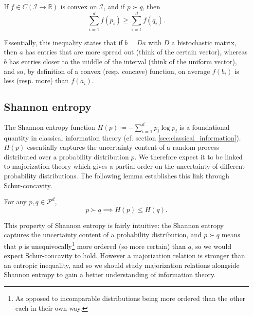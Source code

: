 \begin{lemma} \label{lem:karamata}
    If $f \in C(\mathcal{I} \to \mathbb{R})$ is convex on $\mathcal{I}$, and if $p \succ q$, then
    \begin{equation}
        \sum_{i=1}^{d} f(p_i) \geq \sum_{i=1}^{d} f(q_i).
    \end{equation}
\end{lemma}

Essentially, this inequality states that if $b = Da$ with $D$ a bistochastic matrix, then $a$ has entries that are more spread out (think of the certain vector), whereas $b$ has entries closer to the middle of the interval (think of the uniform vector), and so, by definition of a convex (resp. concave) function, on average $f(b_i)$ is less (resp. more) than $f(a_i)$.



\subsection{Shannon entropy} \label{sec:schur_shannon}

The Shannon entropy function $H(p) \coloneqq - \sum_{i = 1}^{d} p_i \log p_i$ is a foundational quantity in classical information theory (cf. section \ref{sec:classical_information}). $H(p)$ essentially captures the uncertainty content of a random process distributed over a probability distribution $p$. We therefore expect it to be linked to majorization theory which gives a partial order on the uncertainty of different probability distributions. The following lemma establishes this link through Schur-concavity.

\begin{lemma}
    For any $p, q \in \mathcal{P}^d$,
    \begin{equation}
        p \succ q \implies  H(p) \leq H(q).
    \end{equation}
\end{lemma}

This property of Shannon entropy is fairly intuitive: the Shannon entropy captures the uncertainty content of a probability distribution, and $p \succ q$ means that $p$ is unequivocally\footnote{As opposed to incomparable distributions being more ordered than the other each in their own way.} more ordered (so more certain) than $q$, so we would expect Schur-concavity to hold. However a majorization relation is stronger than an entropic inequality, and so we should study majorization relations alongside Shannon entropy to gain a better understanding of information theory.




